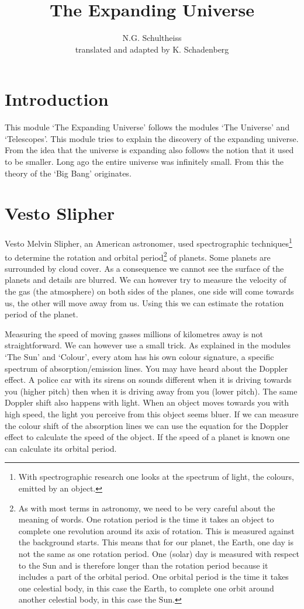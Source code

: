 \documentclass[12pt,a4paper]{article}
\author{N.G. Schultheiss \\ translated and adapted by K. Schadenberg}
\date{}
\title{The Expanding Universe}
\numberwithin{equation}{section}
\numberwithin{figure}{section}
\numberwithin{table}{section}
\begin{document}
\maketitle

\section{Introduction}
This module `The Expanding Universe' follows the modules `The Universe' and `Telescopes'. This module tries to explain the discovery of the expanding universe. From the idea that the universe is expanding also follows the notion that it used to be smaller. Long ago the entire universe was infinitely small. From this the theory of the `Big Bang' originates.

\section{Vesto Slipher}
Vesto Melvin Slipher, an American astronomer, used spectrographic techniques\footnote{With spectrographic research one looks at the spectrum of light, the colours, emitted by an object.} to determine the rotation and orbital period\footnote{As with most terms in astronomy, we need to be very careful about the meaning of words. One rotation period is the time it takes an object to complete one revolution around its axis of rotation. This is measured against the background starts. This means that for our planet, the Earth, one day is not the same as one rotation period. One (solar) day is measured with respect to the Sun and is therefore longer than the rotation period because it includes a part of the orbital period. One orbital period is the time it takes one celestial body, in this case the Earth, to complete one orbit around another celestial body, in this case the Sun.} of planets. Some planets are surrounded by cloud cover. As a consequence we cannot see the surface of the planets and details are blurred. We can however try to measure the velocity of the gas (the atmosphere) on both sides of the planes, one side will come towards us, the other will move away from us. Using this we can estimate the rotation period of the planet.

Measuring the speed of moving gasses millions of kilometres away is not straightforward. We can however use a small trick. As explained in the modules `The Sun' and `Colour', every atom has his own colour signature, a specific spectrum of absorption/emission lines. You may have heard about the Doppler effect. A police car with its sirens on sounds different when it is driving towards you (higher pitch) then when it is driving away from you (lower pitch). The same Doppler shift also happens with light. When an object moves towards you with high speed, the light you perceive from this object seems bluer. If we can measure the colour shift of the absorption lines we can use the equation for the Doppler effect to calculate the speed of the object. If the speed of a planet is known one can calculate its orbital period.
\end{document}
